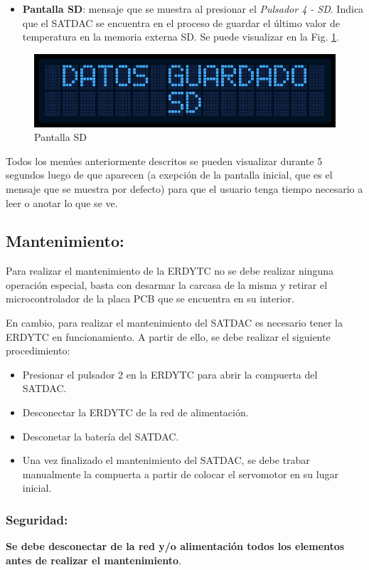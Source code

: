 \documentclass[conference]{IEEEtran}
\begin{document}
\begin{itemize}
\item \textbf{Pantalla SD}: mensaje que se muestra al presionar el \emph{Pulsador 4 - SD}. Indica que el SATDAC se encuentra en el proceso de guardar el último valor de temperatura en la memoria externa SD. Se puede visualizar en la Fig. \ref{fig:pantallaSD}.
\end{itemize}

\begin{figure}[htbp]
\centering
\includegraphics[width=.9\linewidth]{../../images/pantallaSD.png}
\caption{\label{fig:pantallaSD}Pantalla SD}
\end{figure}

Todos los menúes anteriormente descritos se pueden visualizar durante 5 segundos luego de que aparecen (a exepción de la pantalla inicial, que es el mensaje que se muestra por defecto) para que el usuario tenga tiempo necesario a leer o anotar lo que se ve.
\subsection{Mantenimiento:}
\label{sec:org25d5585}
Para realizar el mantenimiento de la ERDYTC no se debe realizar ninguna operación especial, basta con desarmar la carcasa de la misma y retirar el microcontrolador de la placa PCB que se encuentra en su interior.

En cambio, para realizar el mantenimiento del SATDAC es necesario tener la ERDYTC en funcionamiento. A partir de ello, se debe realizar el siguiente procedimiento:

\begin{itemize}
\item Presionar el pulsador 2 en la ERDYTC para abrir la compuerta del SATDAC.
\item Desconectar la ERDYTC de la red de alimentación.
\item Desconetar la batería del SATDAC.
\item Una vez finalizado el mantenimiento del SATDAC, se debe trabar manualmente la compuerta a partir de colocar el servomotor en su lugar inicial.
\end{itemize}
\subsubsection{Seguridad:}
\label{sec:orgfb50933}
\textbf{Se debe desconectar de la red y/o alimentación todos los elementos antes de realizar el mantenimiento}.
\end{document}
